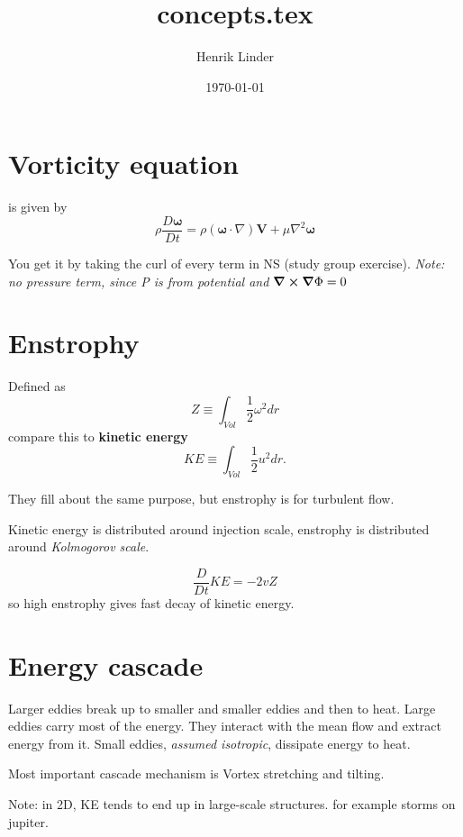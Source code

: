 \documentclass{article}
\title{concepts.tex }
\author{Henrik Linder}
\date{\today}
\let\vec\mathbf
\begin{document}
\maketitle
\section{Vorticity equation}
is given by 
\begin{equation}
	\rho \frac{D\vec \omega}{Dt} = \rho(\vec\omega \cdot \nabla)\vec V + \mu \nabla ^{2}\vec \omega
\end{equation}

You get it by taking the curl of every term in NS (study group exercise). \textit{Note: no pressure term, since P is from potential and $\curl\grad \Phi = 0$}




\section{Enstrophy}
Defined as  
\begin{equation}
	Z\equiv \int_{Vol}\frac{1}{2}\omega^{2}dr
\end{equation}
compare this to 
\textbf{kinetic energy}
\begin{equation}
	KE \equiv \int_{Vol}\frac{1}{2}u^{2}dr.
\end{equation}

They fill about the same purpose, but enstrophy is for turbulent flow. 

Kinetic energy is distributed around injection scale, enstrophy is distributed around \textit{Kolmogorov scale}.

\begin{equation}
	\frac{D}{Dt}KE = -2vZ
\end{equation}
so high enstrophy gives fast decay of kinetic energy. 


\section{Energy cascade}
Larger eddies break up to smaller and smaller eddies and then to heat. Large eddies carry most of the energy. They interact with the mean flow and extract energy from it. Small eddies, \textit{assumed isotropic}, dissipate energy to heat.

Most important cascade mechanism is Vortex stretching and tilting. 

Note: in 2D, KE tends to end up in large-scale structures. for example storms on jupiter. 
\end{document}
